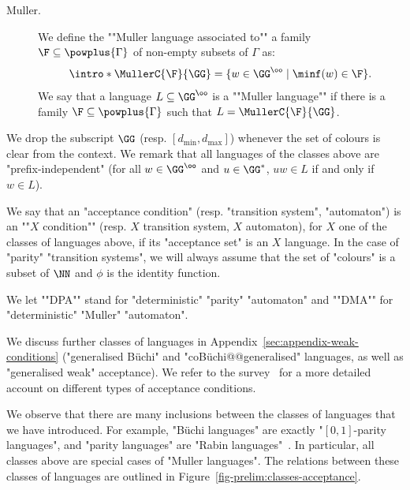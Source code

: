 \documentclass[10pt,a4paper]{amsart}
\begin{document}
\begin{description}
	\item[Muller.] \AP We define the ""Muller language associated to"" a family $\F\subseteq \powplus{\Gamma}$ of non-empty subsets of $\Gamma$ as:
	\[ \intro*\MullerC{\F}{\GG} = \{w\in \GG^\oo \mid \minf(w) \in \F\}. \]
	\AP We say that a language $L\subseteq \GG^\oo$ is a ""Muller language"" if there is a family $\F\subseteq \powplus{\Gamma}$ such that $L = \MullerC{\F}{\GG}$. %
\end{description}


We drop the subscript $\GG$ (resp. $[d_{\min}, d_{\max}]$) whenever the set of colours is clear from the context. 
We remark that all languages of the classes above are "prefix-independent" (for all $w\in \GG^\oo$ and $u\in \GG^*$,  $uw\in L$ if and only if $w\in L$).


\AP We say that an "acceptance condition" (resp. "transition system", "automaton") is an ""$X$ condition"" (resp. $X$ transition system, $X$ automaton), for $X$ one of the classes of languages above, if its "acceptance set" is an $X$ language. 
In the case of "parity" "transition systems", we will always assume that the set of "colours" is a subset of $\NN$ and $\phi$ is the identity function.

\AP We let ""DPA"" stand for "deterministic" "parity" "automaton" and ""DMA"" for "deterministic" "Muller" "automaton".



We discuss further classes of languages in Appendix~\ref{sec:appendix-weak-conditions} ("generalised B\"uchi" and "coB\"uchi@@generalised" languages, as well as "generalised weak" acceptance). We refer to the survey~\cite{Boker18WhyTypes} for a more detailed account on different types of acceptance conditions.

\begin{remark}
	We observe that there are many inclusions between the classes of languages that we have introduced. For example, "Büchi languages" are exactly "$[0,1]$-parity languages", and "parity languages" are "Rabin languages"~\cite{Mostowski1984RegularEF}. 
	In particular, all  classes above are special cases of "Muller languages".
	The relations between these classes of languages are outlined in Figure~\ref{fig-prelim:classes-acceptance}. 
\end{remark}
\end{document}
